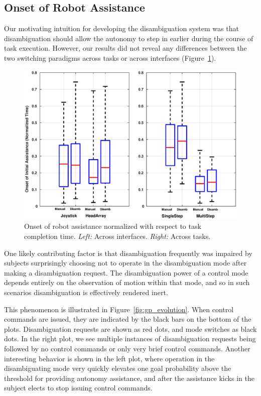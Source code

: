 \documentclass[natbib, twocolumn]{svjour3}          %
\begin{document}
\subsection{Onset of Robot Assistance}\label{ssec:onset}
Our motivating intuition for developing the disambiguation system was that disambiguation should allow the autonomy to step in earlier during the course of task execution. However, our results did not reveal any differences between the two switching paradigms across tasks or across interfaces (Figure~\ref{fig:initial_blend}). 
\begin{figure}[h!]
	\centering
	\includegraphics[width = 1\hsize ,center]{Fig10.eps}
	\caption{Onset of robot assistance normalized with respect to task completion time. \textit{Left:} Across interfaces. \textit{Right:} Across tasks.}
	\label{fig:initial_blend}
\end{figure}

One likely contributing factor is that disambiguation frequently was impaired by subjects surprisingly choosing not to operate in the disambiguation mode after making a disambiguation request. The disambiguation power of a control mode depends entirely on the observation of motion within that mode, and so in such scenarios disambiguation is effectively rendered inert.

This phenomenon is illustrated in Figure~\ref{fig:gp_evolution}. When control commands are issued, they are indicated by the black bars on the bottom of the plots. Disambiguation requests are shown as red dots, and mode switches as black dots. In the right plot, we see multiple instances of disambiguation requests being followed by no control commands or only very brief control commands. Another interesting behavior is shown in the left plot, where operation in the disambiguating mode very quickly elevates one goal probability above the threshold for providing autonomy assistance, and after the assistance kicks in the subject elects to stop issuing control commands.
\end{document}
